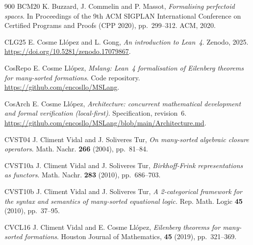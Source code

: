 \begin{thebibliography}{900}
\bibitem%
{BCM20} K. Buzzard, J. Commelin and P. Massot, \emph{Formalising perfectoid spaces}. In Proceedings of the 9th ACM SIGPLAN International Conference on Certified Programs and Proofs (CPP 2020), pp.~299--312. ACM, 2020.



\bibitem%
{CLG25} E. Cosme Ll\'{o}pez and L. Gong, \emph{An introduction to Lean~4}. Zenodo, 2025. \url{https://doi.org/10.5281/zenodo.17079867}.

\bibitem%
{CosRepo} E. Cosme Ll\'{o}pez, \emph{Mslang: Lean~4 formalisation of Eilenberg theorems for many-sorted formations}. Code repository. \url{https://github.com/encosllo/MSLang}.

\bibitem%
{CosArch} E. Cosme Ll\'{o}pez, \emph{Architecture: concurrent mathematical development and formal verification (local-first)}. Specification, revision~6. \url{https://github.com/encosllo/MSLang/blob/main/Architecture.md}.

\bibitem%
{CVST04} J. Climent Vidal and J. Soliveres Tur,\emph{ On many-sorted algebraic closure operators}. Math. Nachr. \textbf{266} (2004), pp.~81--84. 

\bibitem%
{CVST10a} J. Climent Vidal and J. Soliveres Tur,\emph{ Birkhoff-Frink representations as functors}. Math. Nachr. \textbf{283} (2010), pp.~686--703. 

\bibitem%
{CVST10b} J. Climent Vidal and J. Soliveres Tur,\emph{ A 2-categorical framework for the syntax and semantics of many-sorted equational logic.} Rep. Math. Logic  \textbf{45} (2010), pp.~37--95.

\bibitem%
{CVCL16} J. Climent Vidal and E. Cosme Ll\'{o}pez, \emph{Eilenberg theorems for many-sorted formations}.  Houston Journal of Mathematics, \textbf{45} (2019), pp.~321--369.


\end{thebibliography}
